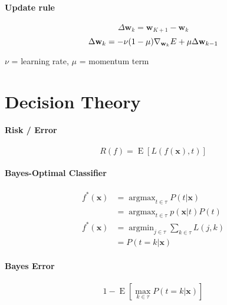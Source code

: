 \documentclass[9pt]{scrartcl}
\DeclareMathOperator*{\argmax}{argmax}
\DeclareMathOperator*{\argmin}{argmin}
\DeclareMathOperator{\E}{E}
\begin{document}
\begin{multicols}{4}
\paragraph{Update rule}

\[\Delta \mathbf w_k = \mathbf w_{K+1}-\mathbf w_k\]
\[\Delta \mathbf w_k = -\nu(1-\mu)\nabla_{\textbf w_k}E+\mu \Delta \mathbf w_{k-1}\]

$\nu$ = learning rate, $\mu$ = momentum term

\section{Decision Theory}
\paragraph{Risk / Error}
\[ R(f) = \E \left [ L(f(\mathbf x), t) \right ] \]

\paragraph{Bayes-Optimal Classifier}
\begin{align*}
f^*(\mathbf x) &= \argmax_{t \in \tau} P(t|\mathbf x) \\ 
&= \argmax_{t \in \tau} p(\mathbf x|t) P(t) \\
f^*(\mathbf x) &= \argmin_{j \in \tau} \sum_{k \in \tau} L(j,k) \\ 
 &= P(t = k | \mathbf x) \end{align*}

\paragraph{Bayes Error}
\begin{equation*} 1 - \E \left [ \max_{k\in\tau} P(t = k | \mathbf x) \right ] \end{equation*}

\end{multicols}
\end{document}
